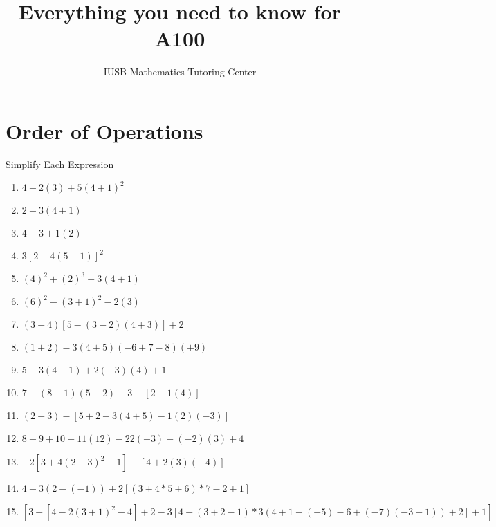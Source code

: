 \documentclass{article}
\title{Everything you need to know for A100}
\date{\mydate}
\author{IUSB Mathematics Tutoring Center}
\begin{document}
\maketitle
\newpage
{}
\tableofcontents

\newpage
\section{Order of Operations}
Simplify Each Expression\\
\begin{enumerate}
\item $4+2(3)+5(4+1)^{2}$
\item $2+3(4+1)$
\item $4-3+1(2)$
\item $3[2+4(5-1)]^{2}$
\item $(4)^{2}+(2)^{3}+3(4+1)$
\item $(6)^{2}-(3+1)^{2}-2(3)$
\item $(3-4)[5-(3-2)(4+3)]+2$
\item $(1+2)-3(4+5)(-6+7-8)(+9)$
\item $5-3(4-1)+2(-3)(4)+1$
\item $7+(8-1)(5-2)-3+[2-1(4)]$
\item $(2-3)-[5+2-3(4+5)-1(2)(-3)]$
\item $8-9+10-11(12)-22(-3)-(-2)(3)+4$
\item $-2[3+4(2-3)^{2}-1]+[4+2(3)(-4)]$
\item $4+3(2-(-1))+2[(3+4*5+6)*7-2+1]$
\item $[3+[4-2(3+1)^{2}-4]+2-3[4-(3+2-1)*3(4+1-(-5)-6+(-7)(-3+1))+2]+1]$
\end{enumerate}

\newpage
\end{document}
